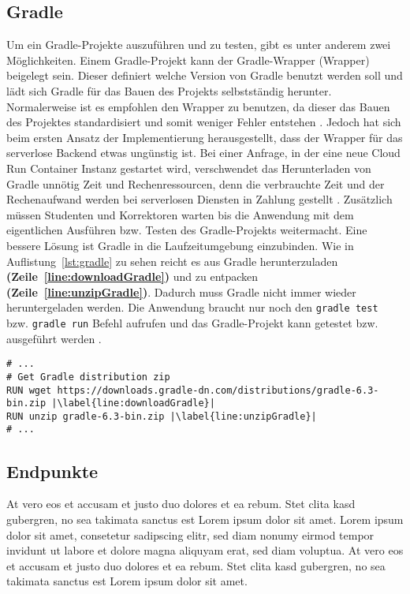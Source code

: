\subsection{Gradle}
Um ein Gradle-Projekte auszuführen und zu testen,
gibt es unter anderem zwei Möglichkeiten. Einem Gradle-Projekt
kann der Gradle-Wrapper (Wrapper) beigelegt sein.
Dieser definiert welche Version von Gradle benutzt
werden soll und lädt sich Gradle für das Bauen des Projekts selbstständig herunter.
Normalerweise ist es empfohlen den Wrapper zu benutzen,
da dieser das Bauen des Projektes standardisiert und
somit weniger Fehler entstehen \cite{GradleWrapper}.
Jedoch hat sich beim ersten Ansatz der Implementierung herausgestellt, dass der
Wrapper für das serverlose Backend etwas ungünstig ist.
Bei einer Anfrage, in der eine neue Cloud Run Container Instanz
gestartet wird, verschwendet das Herunterladen von Gradle
unnötig Zeit und Rechenressourcen, denn die verbrauchte Zeit und der Rechenaufwand
werden bei serverlosen Diensten in Zahlung gestellt \cite{ServerlessTrends}.
Zusätzlich müssen Studenten und Korrektoren warten bis die Anwendung mit dem eigentlichen
Ausführen bzw. Testen des Gradle-Projekts weitermacht.
Eine bessere Lösung ist Gradle in die Laufzeitumgebung einzubinden.
Wie in Auflistung~\ref{lst:gradle} zu sehen reicht es aus Gradle herunterzuladen
\textbf{(Zeile~\ref{line:downloadGradle})}
und zu entpacken \textbf{(Zeile~\ref{line:unzipGradle})}.
Dadurch muss Gradle nicht immer wieder heruntergeladen werden.
Die Anwendung braucht nur noch den \texttt{gradle test} bzw. \texttt{gradle run} Befehl
aufrufen und das Gradle-Projekt kann getestet bzw. ausgeführt werden \cite{GradleCLI}.\\

\begin{lstlisting}[caption={Ausschnitt aus der Dockerfile. Herunterladen und Entpacken von Gradle.}, label={lst:gradle}, escapechar=|]
# ... 
# Get Gradle distribution zip
RUN wget https://downloads.gradle-dn.com/distributions/gradle-6.3-bin.zip |\label{line:downloadGradle}|
RUN unzip gradle-6.3-bin.zip |\label{line:unzipGradle}|
# ...
\end{lstlisting}

\subsection{Endpunkte}
At vero eos et accusam et justo duo dolores et ea rebum. Stet clita kasd gubergren,
no sea takimata sanctus est Lorem ipsum dolor sit amet. Lorem ipsum dolor sit amet,
consetetur sadipscing elitr, sed diam nonumy eirmod tempor invidunt ut labore et
dolore magna aliquyam erat, sed diam voluptua.
At vero eos et accusam et justo duo dolores et ea rebum.
Stet clita kasd gubergren, no sea takimata sanctus est Lorem ipsum dolor sit amet.

